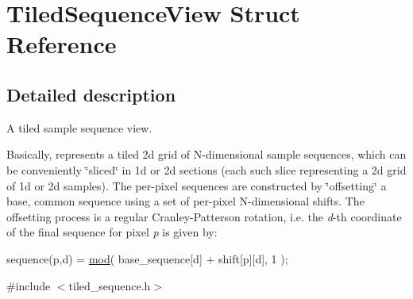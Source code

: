 \hypertarget{struct_tiled_sequence_view}{}\section{Tiled\+Sequence\+View Struct Reference}
\label{struct_tiled_sequence_view}


\subsection{Detailed description}
A tiled sample sequence view.

\begin{DoxyParagraph}{}
Basically, represents a tiled 2d grid of N-\/dimensional sample sequences, which can be conveniently \char`\"{}sliced\char`\"{} in 1d or 2d sections (each such slice representing a 2d grid of 1d or 2d samples). The per-\/pixel sequences are constructed by \char`\"{}offsetting\char`\"{} a base, common sequence using a set of per-\/pixel N-\/dimensional shifts. The offsetting process is a regular Cranley-\/\+Patterson rotation, i.\+e. the {\itshape d}-\/th coordinate of the final sequence for pixel {\itshape p} is given by\+: ~\newline

\begin{DoxyCode}
sequence(p,d) = \hyperlink{group___basic_gaa6ea8810d6e0f5f42d49be632566378c}{mod}( base\_sequence[d] + shift[p][d], 1 );
\end{DoxyCode}
 
\end{DoxyParagraph}


{\ttfamily \#include $<$tiled\+\_\+sequence.\+h$>$}

